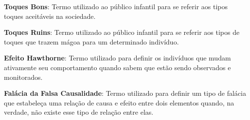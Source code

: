 {%

\textbf{Toques Bons}: Termo utilizado ao público infantil para se referir aos tipos toques aceitáveis na sociedade. 

\textbf{Toques Ruins}: Termo utilizado ao público infantil para se referir aos tipos de toques que trazem mágoa para um determinado indivíduo. 

\textbf{Efeito Hawthorne}: Termo utilizado para definir os indivíduos que mudam ativamente seu comportamento quando sabem que estão sendo observados e monitorados.

\textbf{Falácia da Falsa Causalidade}: Termo utilizado para definir um tipo de falácia que estabeleça uma relação de causa e efeito entre dois elementos quando, na verdade, não existe esse tipo de relação entre elas.



} %


